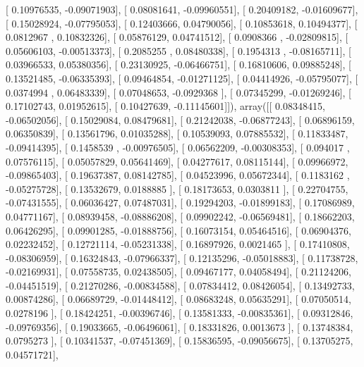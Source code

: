 \documentclass{article}
\begin{document}
       [ 0.10976535, -0.09071903],
       [ 0.08081641, -0.09960551],
       [ 0.20409182, -0.01609677],
       [ 0.15028924, -0.07795053],
       [ 0.12403666,  0.04790056],
       [ 0.10853618,  0.10494377],
       [ 0.0812967 ,  0.10832326],
       [ 0.05876129,  0.04741512],
       [ 0.0908366 , -0.02809815],
       [ 0.05606103, -0.00513373],
       [ 0.2085255 ,  0.08480338],
       [ 0.1954313 , -0.08165711],
       [ 0.03966533,  0.05380356],
       [ 0.23130925, -0.06466751],
       [ 0.16810606,  0.09885248],
       [ 0.13521485, -0.06335393],
       [ 0.09464854, -0.01271125],
       [ 0.04414926, -0.05795077],
       [ 0.0374994 ,  0.06483339],
       [ 0.07048653, -0.0929368 ],
       [ 0.07345299, -0.01269246],
       [ 0.17102743,  0.01952615],
       [ 0.10427639, -0.11145601]]), array([[ 0.08348415, -0.06502056],
       [ 0.15029084,  0.08479681],
       [ 0.21242038, -0.06877243],
       [ 0.06896159,  0.06350839],
       [ 0.13561796,  0.01035288],
       [ 0.10539093,  0.07885532],
       [ 0.11833487, -0.09414395],
       [ 0.1458539 , -0.00976505],
       [ 0.06562209, -0.00308353],
       [ 0.094017  ,  0.07576115],
       [ 0.05057829,  0.05641469],
       [ 0.04277617,  0.08115144],
       [ 0.09966972, -0.09865403],
       [ 0.19637387,  0.08142785],
       [ 0.04523996,  0.05672344],
       [ 0.1183162 , -0.05275728],
       [ 0.13532679,  0.0188885 ],
       [ 0.18173653,  0.0303811 ],
       [ 0.22704755, -0.07431555],
       [ 0.06036427,  0.07487031],
       [ 0.19294203, -0.01899183],
       [ 0.17086989,  0.04771167],
       [ 0.08939458, -0.08886208],
       [ 0.09902242, -0.06569481],
       [ 0.18662203,  0.06426295],
       [ 0.09901285, -0.01888756],
       [ 0.16073154,  0.05464516],
       [ 0.06904376,  0.02232452],
       [ 0.12721114, -0.05231338],
       [ 0.16897926,  0.0021465 ],
       [ 0.17410808, -0.08306959],
       [ 0.16324843, -0.07966337],
       [ 0.12135296, -0.05018883],
       [ 0.11738728, -0.02169931],
       [ 0.07558735,  0.02438505],
       [ 0.09467177,  0.04058494],
       [ 0.21124206, -0.04451519],
       [ 0.21270286, -0.00834588],
       [ 0.07834412,  0.08426054],
       [ 0.13492733,  0.00874286],
       [ 0.06689729, -0.01448412],
       [ 0.08683248,  0.05635291],
       [ 0.07050514,  0.0278196 ],
       [ 0.18424251, -0.00396746],
       [ 0.13581333, -0.00835361],
       [ 0.09312846, -0.09769356],
       [ 0.19033665, -0.06496061],
       [ 0.18331826,  0.0013673 ],
       [ 0.13748384,  0.0795273 ],
       [ 0.10341537, -0.07451369],
       [ 0.15836595, -0.09056675],
       [ 0.13705275,  0.04571721],
\end{document}
